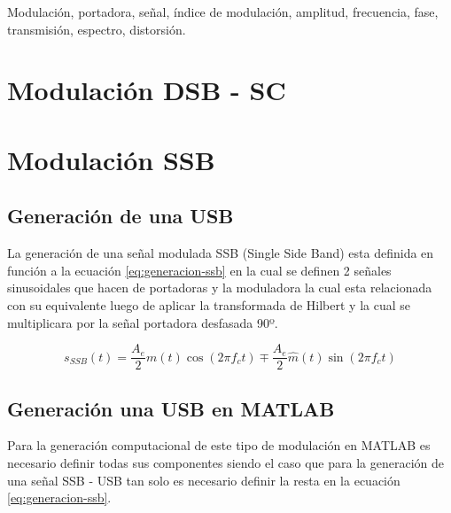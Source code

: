 \documentclass[conference]{IEEEtran}
\begin{document}
	\begin{IEEEkeywords}
		Modulación, portadora, señal, índice de modulación, amplitud, frecuencia, fase, transmisión, espectro, distorsión.
	\end{IEEEkeywords}
	
	
	\section{Modulación DSB - SC}
	
	\section{Modulación SSB}
	\subsection{\textbf{Generación de una USB}}
	
	La generación de una señal modulada SSB (Single Side Band) esta definida en función a la ecuación \ref{eq:generacion-ssb} en la cual se definen 2 señales sinusoidales que hacen de portadoras y la moduladora la cual esta relacionada con su equivalente luego de aplicar la transformada de Hilbert y la cual se multiplicara por la señal portadora desfasada 90º.
	
	\begin{equation}
		s_{SSB}(t) = \frac{A_e}{2}m(t)\cos(2\pi f_c t) \mp \frac{A_e}{2}\hat{m}(t)\sin(2\pi f_c t)
		\label{eq:generacion-ssb}
	\end{equation}
	
	\subsection{\textbf{Generación una USB en MATLAB}}
	
	Para la generación computacional de este tipo de modulación en MATLAB es necesario definir todas sus componentes siendo el caso que para la generación de una señal SSB - USB tan solo es necesario definir la resta en la ecuación \ref{eq:generacion-ssb}.
	
\end{document}
